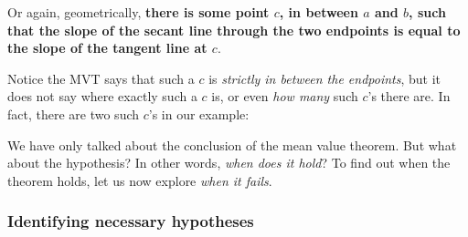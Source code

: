 \documentclass[pdftex, brazil, 12pt, twoside]{article}
\begin{document}
Or again, geometrically, \textbf{there is some point $c$, in between $a$
and $b$, such that the slope of the secant line through the two
endpoints is equal to the slope of the tangent line at $c$}.

Notice the MVT says that such a $c$ is \emph{strictly
in between the endpoints}, but it does not
say where exactly such a $c$ is, or even
\emph{how many} such $c$'s there are.
In fact, there are two such $c$'s in our example:

\begin{figure}[H]
  \begin{center}
    \label{fig:mvt-avgxinst-11}
  \end{center}
\end{figure}

We have only talked about the conclusion of the mean value
theorem. But what about the hypothesis?
In other words, \emph{when does it hold}?
To find out when the theorem holds,
let us now explore \emph{when it fails}.

\subsubsection{Identifying necessary hypotheses}
\label{u1-mvt-hypot}
\end{document}
